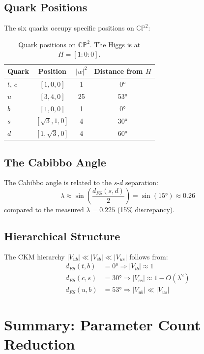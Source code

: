\documentclass[11pt,a4paper]{article}
\newcommand{\CP}{\mathbb{CP}}
\begin{document}
\subsection{Quark Positions}

The six quarks occupy specific positions on $\CP^2$:

\begin{table}[h]
\centering
\begin{tabular}{lccc}
\toprule
Quark & Position & $|w|^2$ & Distance from $H$ \\
\midrule
$t$, $c$ & $[1, 0, 0]$ & 1 & 0° \\
$u$ & $[3, 4, 0]$ & 25 & 53° \\
$b$ & $[1, 0, 0]$ & 1 & 0° \\
$s$ & $[\sqrt{3}, 1, 0]$ & 4 & 30° \\
$d$ & $[1, \sqrt{3}, 0]$ & 4 & 60° \\
\bottomrule
\end{tabular}
\caption{Quark positions on $\CP^2$. The Higgs is at $H = [1:0:0]$.}
\end{table}

\subsection{The Cabibbo Angle}

The Cabibbo angle is related to the $s$-$d$ separation:
\begin{equation}
\lambda \approx \sin\left(\frac{d_{FS}(s,d)}{2}\right) = \sin(15°) \approx 0.26
\end{equation}
compared to the measured $\lambda = 0.225$ (15\% discrepancy).

\subsection{Hierarchical Structure}

The CKM hierarchy $|V_{ub}| \ll |V_{cb}| \ll |V_{us}|$ follows from:
\begin{align}
d_{FS}(t,b) &= 0° \Rightarrow |V_{tb}| \approx 1 \\
d_{FS}(c,s) &= 30° \Rightarrow |V_{cs}| \approx 1 - O(\lambda^2) \\
d_{FS}(u,b) &= 53° \Rightarrow |V_{ub}| \ll |V_{us}|
\end{align}

\section{Summary: Parameter Count Reduction}
\end{document}
